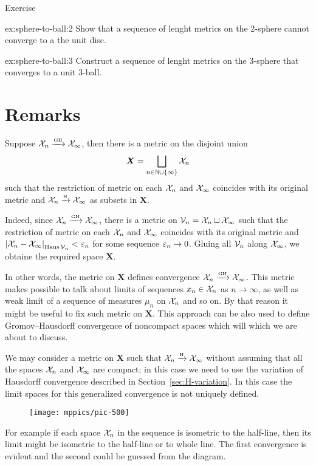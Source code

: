 \begin{thm}{Exercise}\label{ex:sphere-to-ball}
\begin{subthm}{ex:sphere-to-ball:2}
Show that a sequence of lenght metrics on the 2-sphere cannot converge to a the unit disc.
\end{subthm}

\begin{subthm}{ex:sphere-to-ball:3}
Construct a sequence of lenght metrics on the 3-sphere that converges to a unit 3-ball.
\end{subthm}

\end{thm}

\section{Remarks}

Suppose $\mathcal{X}_n\xrightarrow{\mbox{\tiny\rm GH}} \mathcal{X}_\infty$, then there is a metric on the disjoint union 
\[\bm{X}=\bigsqcup_{n\in \mathbb{N}\cup\{\infty\}} \mathcal{X}_n\]
such that the restriction of metric on each $\mathcal{X}_n$ and $\mathcal{X}_\infty$ coincides with its original metric and $\mathcal{X}_n\xrightarrow{\mbox{\tiny\rm H}} \mathcal{X}_\infty$ as subsets in $\bm{X}$.

Indeed, since $\mathcal{X}_n\xrightarrow{\mbox{\tiny\rm GH}} \mathcal{X}_\infty$, there is a metric on $\mathcal{V}_n=\mathcal{X}_n\sqcup \mathcal{X}_\infty$ such that the restriction of metric on each $\mathcal{X}_n$ and $\mathcal{X}_\infty$ coincides with its original metric and $\dist{\spc{X}_n}{\spc{X}_\infty}{\Haus\spc{V}_n}<\eps_n$ for some sequence $\varepsilon_n\to 0$.
Gluing all $\mathcal{V}_n$ along $\mathcal{X}_\infty$, we obtaine the required space $\bm{X}$.

In other words, the metric on $\bm{X}$ defines convergence $\mathcal{X}_n\xrightarrow{\mbox{\tiny\rm GH}} \mathcal{X}_\infty$.
This metric makes possible to talk about limits of sequences $x_n\in \mathcal{X}_n$ as $n\to\infty$, as well as weak limit of a sequence of measures $\mu_n$ on $\mathcal{X}_n$ and so on.
By that reason it might be useful to fix such metric on $\bm{X}$.
This approach can be also used to define Gromov--Hausdorff convergence of noncompact spaces which will which we are about to discuss.

We may consider a metric on $\bm{X}$ such that $\mathcal{X}_n\xrightarrow{\mbox{\tiny\rm H}} \mathcal{X}_\infty$ without assuming that all the spaces $\mathcal{X}_n$ and $\mathcal{X}_\infty$ are compact; in this case we need to use the variation of Hausdorff convergence described in Section~\ref{sec:H-variation}.
In this case the limit spaces for this generalized convergence is not uniquely defined.
\begin{figure}[h!]
\vskip-0mm
\centering
\texttt{[image: mppics/pic-500]}
\end{figure}
For example if each space $\mathcal{X}_n$ in the sequence is isometric to the half-line, then its limit might be isometric to the half-line or to whole line.
The first convergence is evident and the second could be guessed from the diagram.




